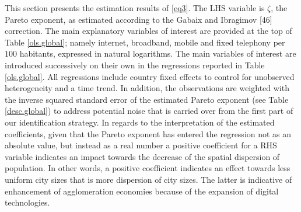\documentclass[10pt,letterpaper]{article}
\begin{document}
This section presents the estimation results of \ref{eq3}. The LHS
variable is \(\zeta\), the Pareto exponent, as estimated according to
the Gabaix and Ibragimov {[}46{]} correction. The main explanatory
variables of interest are provided at the top of Table \ref{ols.global};
namely internet, broadband, mobile and fixed telephony per \(100\)
habitants, expressed in natural logarithms. The main variables of
interest are introduced successively on their own in the regressions
reported in Table \ref{ols.global}. All regressions include country
fixed effects to control for unobserved heterogeneity and a time trend.
In addition, the observations are weighted with the inverse squared
standard error of the estimated Pareto exponent (see Table
\ref{desc.global}) to address potential noise that is carried over from
the first part of our identification strategy. In regards to the
interpretation of the estimated coefficients, given that the Pareto
exponent has entered the regression not as an absolute value, but
instead as a real number a positive coefficient for a RHS variable
indicates an impact towards the decrease of the spatial dispersion of
population. In other words, a positive coefficient indicates an effect
towards less uniform city sizes that is more dispersion of city sizes.
The latter is indicative of enhancement of agglomeration economies
because of the expansion of digital technologies.
\end{document}
